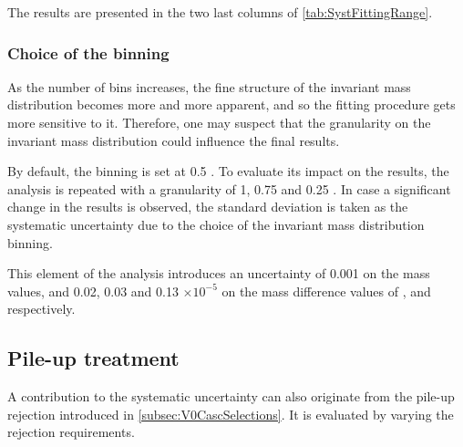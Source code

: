 The results are presented in the two last columns of \tab\ref{tab:SystFittingRange}.

\subsubsection{Choice of the binning}

As the number of bins increases, the fine structure of the invariant mass distribution becomes more and more apparent, and so the fitting procedure gets more sensitive to it. Therefore, one may suspect that the granularity on the invariant mass distribution could influence the final results. 

By default, the binning is set at 0.5 \mmass. To evaluate its impact on the results, the analysis is repeated with a granularity of 1, 0.75 and 0.25 \mmass. In case a significant change in the results is observed, the standard deviation is taken as the systematic uncertainty due to the choice of the invariant mass distribution binning.

This element of the analysis introduces an uncertainty of
0.001 \mmass on the mass values, and 0.02, 0.03 and 0.13 $\times 10^{-5}$ on the mass difference values of \rmLambda, \rmXi and \rmOmega respectively.

\subsection{Pile-up treatment}

A contribution to the systematic uncertainty can also originate from the pile-up rejection introduced in \Sec\ref{subsec:V0CascSelections}. It is evaluated by varying the rejection requirements. 

